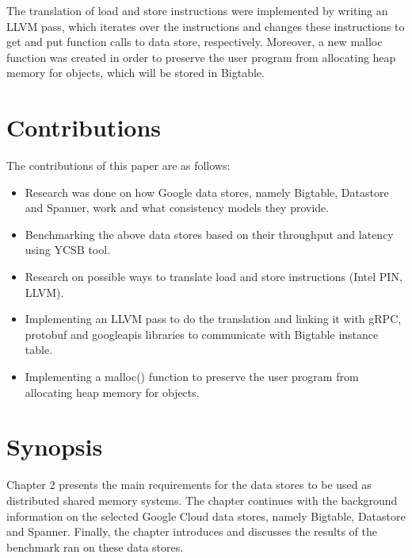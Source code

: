 \documentclass[bsc,frontabs,twoside,singlespacing,parskip,deptreport]{infthesis}     %
\begin{document}

The translation of load and store instructions were implemented by writing an LLVM pass, which iterates over the instructions and changes these instructions to get and put function calls to data store, respectively. Moreover, a new malloc function was created in order to preserve the user program from allocating heap memory for objects, which will be stored in Bigtable.



\section{Contributions}

The contributions of this paper are as follows:
\begin{itemize}
\item
Research was done on how Google data stores, namely Bigtable, Datastore and Spanner, work and what consistency models they provide.
\item
Benchmarking the above data stores based on their throughput and latency using YCSB tool.
\item
Research on possible ways to translate load and store instructions (Intel PIN, LLVM).
\item
Implementing an LLVM pass to do the translation and linking it with gRPC, protobuf and googleapis libraries to communicate with Bigtable instance table.
\item
Implementing a malloc() function to preserve the user program from allocating heap memory for objects.
\end{itemize}


\section{Synopsis}

Chapter 2 presents the main requirements for the data stores to be used as distributed shared memory systems. The chapter continues with the background information on the selected Google Cloud data stores, namely Bigtable, Datastore and Spanner. Finally, the chapter introduces and discusses the results of the benchmark ran on these data stores.
\end{document}
